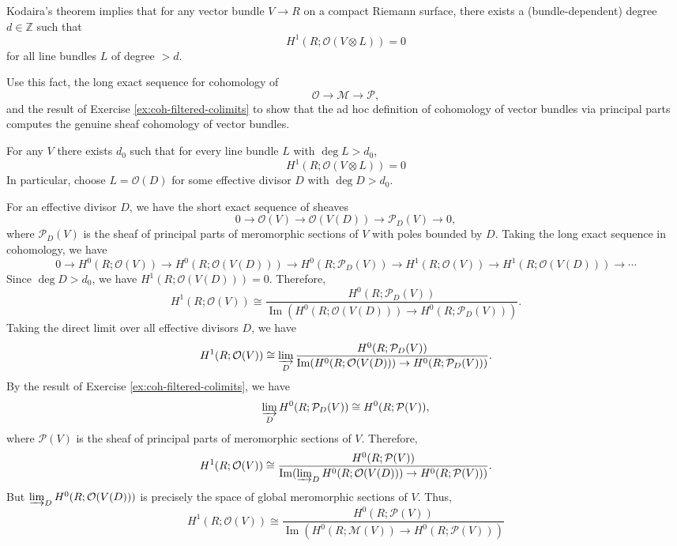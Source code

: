 \documentclass[12pt]{article}
\begin{document}
\begin{exercise}
Kodaira's theorem implies that for any vector bundle $V \to R$ on a compact Riemann surface, there exists a (bundle-dependent) degree $d \in \mathbb{Z}$ such that
\[
H^1(R; \mathcal{O}(V \otimes L)) = 0
\]
for all line bundles $L$ of degree $> d$.

Use this fact, the long exact sequence for cohomology of
\[
\mathcal{O} \to \mathcal{M} \to \mathcal{P},
\]
and the result of Exercise \ref{ex:coh-filtered-colimits} to show that the ad hoc definition of cohomology of vector bundles via principal parts computes the genuine sheaf cohomology of vector bundles.
\end{exercise}

\begin{solution}
For any $V$ there exists $d_0$ such that for every line bundle $L$ with $\deg L > d_0$, \[H^1(R;\mathcal O(V\otimes L)) = 0\] In particular, choose $L = \mathcal O(D)$ for some effective divisor $D$ with $\deg D > d_0$.

For an effective divisor $D$, we have the short exact sequence of sheaves
\[0 \to \mathcal O(V) \to \mathcal O(V(D)) \to \mathcal P_D(V) \to 0,\]
where $\mathcal P_D(V)$ is the sheaf of principal parts of meromorphic sections of $V$ with poles bounded by $D$.
Taking the long exact sequence in cohomology, we have
\[0 \to H^0(R;\mathcal O(V)) \to H^0(R;\mathcal O(V(D))) \to H^0(R;\mathcal P_D(V)) \to H^1(R;\mathcal O(V)) \to H^1(R;\mathcal O(V(D))) \to \cdots\]
Since $\deg D > d_0$, we have $H^1(R;\mathcal O(V(D))) = 0$. Therefore,
\[H^1(R;\mathcal O(V)) \cong \frac{H^0(R;\mathcal P_D(V))}{\operatorname{Im}(H^0(R;\mathcal O(V(D))) \to H^0(R;\mathcal P_D(V)))}.\]
Taking the direct limit over all effective divisors $D$, we have
\[H^1(R;\mathcal O(V)) \cong \varinjlim_D \frac{H^0(R;\mathcal P_D(V))}{\operatorname{Im}(H^0(R;\mathcal O(V(D))) \to H^0(R;\mathcal P_D(V)))}.\]
By the result of Exercise \ref{ex:coh-filtered-colimits}, we have
\[\varinjlim_D H^0(R;\mathcal P_D(V)) \cong H^0(R;\mathcal P(V)),\]
where $\mathcal P(V)$ is the sheaf of principal parts of meromorphic sections of $V$. Therefore,
\[H^1(R;\mathcal O(V)) \cong \frac{H^0(R;\mathcal P(V))}{\operatorname{Im}(\varinjlim_D H^0(R;\mathcal O(V(D))) \to H^0(R;\mathcal P(V)))}.\]
But $\varinjlim_D H^0(R;\mathcal O(V(D)))$ is precisely the space of global meromorphic sections of $V$. Thus,
\[H^1(R;\mathcal O(V)) \cong \frac{H^0(R;\mathcal P(V))}{\operatorname{Im}(H^0(R;\mathcal M(V)) \to H^0(R;\mathcal P(V)))}\]
\end{solution}
\end{document}

